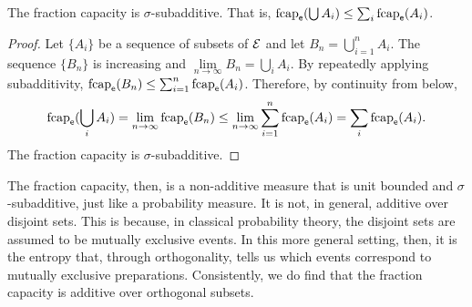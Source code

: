 \begin{mathSection}
\begin{coro}
	The fraction capacity is $\sigma$-subadditive. That is, $\mathrm{fcap}_{\mathsf{e}}(\bigcup A_i) \leq \sum_i \mathrm{fcap}_{\mathsf{e}}(A_i)$.
\end{coro}
\begin{proof}
	Let $\{A_i\}$ be a sequence of subsets of $\mathcal{E}$ and let $B_n = \bigcup_{i=1}^n A_i$. The sequence $\{B_n\}$ is increasing and $\lim\limits_{n \to \infty} B_n = \bigcup_i A_i$. By repeatedly applying subadditivity, $\mathrm{fcap}_{\mathsf{e}}(B_n) \leq \sum_{i=1}^n \mathrm{fcap}_{\mathsf{e}}(A_i)$. Therefore, by continuity from below,
	\begin{equation}
		\begin{aligned}
			\mathrm{fcap}_{\mathsf{e}}(\bigcup_i A_i)= \lim\limits_{n \to \infty} \mathrm{fcap}_{\mathsf{e}}(B_n) \leq \lim\limits_{n \to \infty} \sum_{i=1}^n \mathrm{fcap}_{\mathsf{e}}(A_i) = \sum_i \mathrm{fcap}_{\mathsf{e}}(A_i).
		\end{aligned}
	\end{equation}
	The fraction capacity is $\sigma$-subadditive.
\end{proof}
	
\end{mathSection}

The fraction capacity, then, is a non-additive measure that is unit bounded and $\sigma$-subadditive, just like a probability measure. It is not, in general, additive over disjoint sets. This is because, in classical probability theory, the disjoint sets are assumed to be mutually exclusive events. In this more general setting, then, it is the entropy that, through orthogonality, tells us which events correspond to mutually exclusive preparations. Consistently, we do find that the fraction capacity is additive over orthogonal subsets.

